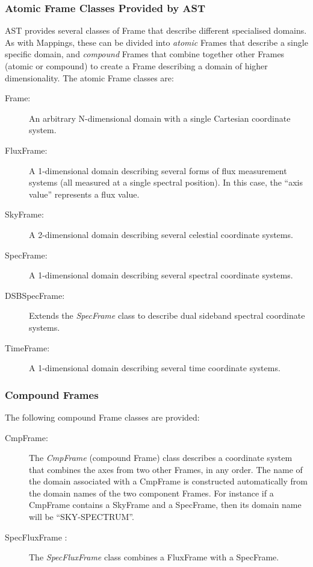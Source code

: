 \documentclass[final,authoryear,5p,times,twocolumn]{elsarticle}
\begin{document}
\subsubsection{Atomic Frame Classes Provided by AST}
AST provides several classes of Frame that describe different specialised
domains. As with Mappings, these can be divided into \emph{atomic} Frames that
describe a single specific domain, and \emph{compound} Frames that combine
together other Frames (atomic or compound) to create a Frame describing a
domain of higher dimensionality. The atomic Frame classes are:

\begin{description}
\item[Frame:] An arbitrary N-dimensional domain with a single Cartesian
coordinate system.
\item[FluxFrame:] A 1-dimensional domain describing several forms of flux
measurement systems (all measured at a single spectral position). In this
case, the ``axis value'' represents a flux value.
\item[SkyFrame:] A 2-dimensional domain describing several celestial
coordinate systems.
\item[SpecFrame:] A 1-dimensional domain describing several spectral
coordinate systems.
\item[DSBSpecFrame:] Extends the \emph{SpecFrame} class to describe dual
sideband spectral coordinate systems.
\item[TimeFrame:] A 1-dimensional domain describing several time coordinate
systems.
\end{description}

\subsubsection{Compound Frames}

The following compound Frame classes are provided:

\begin{description}

\item[CmpFrame:]  The \emph{CmpFrame} (compound Frame) class describes a
coordinate system that combines the axes from two other Frames, in any
order. The name of the domain associated with a CmpFrame is constructed
automatically from the domain names of the two component Frames. For
instance if a CmpFrame contains a SkyFrame and a SpecFrame, then its
domain name will be ``SKY-SPECTRUM''.

\item[SpecFluxFrame :] The \emph{SpecFluxFrame} class combines a FluxFrame
with a SpecFrame.

\end{description}
\end{document}
